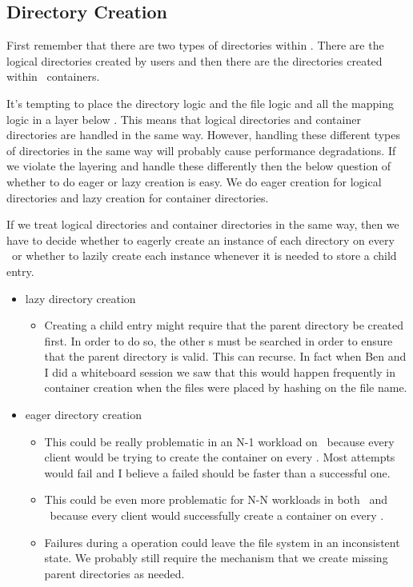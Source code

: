 \documentclass[10pt]{article}
\begin{document}
\subsection{Directory Creation}
\label{sec-dir}

First remember that there are two types of directories within \plfs.  There are
the logical directories created by users and then there are the directories
created within \plfs\ containers.  


It's tempting to place the directory logic and the file logic and all the
mapping logic in a layer below \plfs.  This means that logical directories
and container directories are handled in the same way.  However, handling
these different types of directories in the same way will probably cause
performance degradations.  If we violate the layering and handle these
differently then the below question of whether to do eager or lazy creation
is easy.  We do eager creation for logical directories and lazy creation
for container directories.

If we treat logical directories and container directories in the same way, then
we have to decide whether to eagerly create an instance of each directory on
every \store\ or whether to lazily create each instance whenever it is needed
to store a child entry.


\begin{itemize}
\item{lazy directory creation}
\begin{itemize}
\item{Creating a child entry might require that the parent directory be
created first.  In order to do so, the other {\store}s must be searched
in order to ensure that the parent directory is valid.  This can recurse.  
In fact when Ben and I did a whiteboard
session we saw that this would happen frequently in container creation 
when the files were placed by hashing on the file name.}
\end{itemize}
\item{eager directory creation}
\begin{itemize}
\item{This could be really problematic in an N-1 workload on \fuse\ because 
every client would be trying to create the container on every \store. Most
attempts would fail and I believe a failed  should be faster
than a successful one.}
\item{This could be even more problematic for N-N workloads in both \fuse\
and \adio\ because every client would successfully create a container on
every \store.}
\item{Failures during a  operation could leave the file system
in an inconsistent state.  We probably still require the mechanism that
we create missing parent directories as needed.}
\end{itemize}
\end{itemize}
\end{document}
